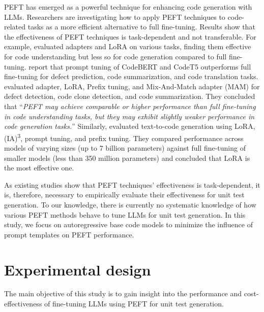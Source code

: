 \documentclass[12pt]{book}
\begin{document}
PEFT has emerged as a powerful technique for enhancing code generation with LLMs. Researchers are investigating how to apply PEFT techniques to code-related tasks as a more efficient alternative to full fine-tuning. Results show that the effectiveness of PEFT techniques is task-dependent and not transferable. For example, \citet{Ayupov2022ParameterEfficientFO} evaluated adapters and LoRA on various tasks, finding them effective for code understanding but less so for code generation compared to full fine-tuning. \citet{Wang2023PromptTI} report that prompt tuning of CodeBERT and CodeT5 outperforms full fine-tuning for defect prediction, code summarization, and code translation tasks. \citet{Liu2023AnES} evaluated adapter, LoRA, Prefix tuning, and Mix-And-Match adapter (MAM) \citep{mam} for defect detection, code clone detection, and code summarization. They concluded that ``\textit{PEFT may achieve comparable or higher performance than full fine-tuning in code understanding tasks, but they may exhibit slightly weaker performance in code generation tasks.}'' Similarly, \citet{weyssow2024exploring} evaluated text-to-code generation using LoRA, (IA)\textsuperscript{3}, prompt tuning, and prefix tuning. They compared performance across models of varying sizes (up to 7 billion parameters) against full fine-tuning of smaller models (less than 350 million parameters) and concluded that LoRA is the most effective one.

As existing studies show that PEFT techniques' effectiveness is task-dependent, it is, therefore, necessary to empirically evaluate their effectiveness for unit test generation.  
To our knowledge, there is currently no systematic knowledge of how various PEFT methods behave to tune LLMs for unit test generation. In this study, we focus on autoregressive base code models to minimize the influence of prompt templates on PEFT performance.   

\section{Experimental design}
\label{chap:experimental-design}
The main objective of this study is to gain insight into the performance and cost-effectiveness of fine-tuning LLMs using PEFT for unit test generation.
\end{document}
